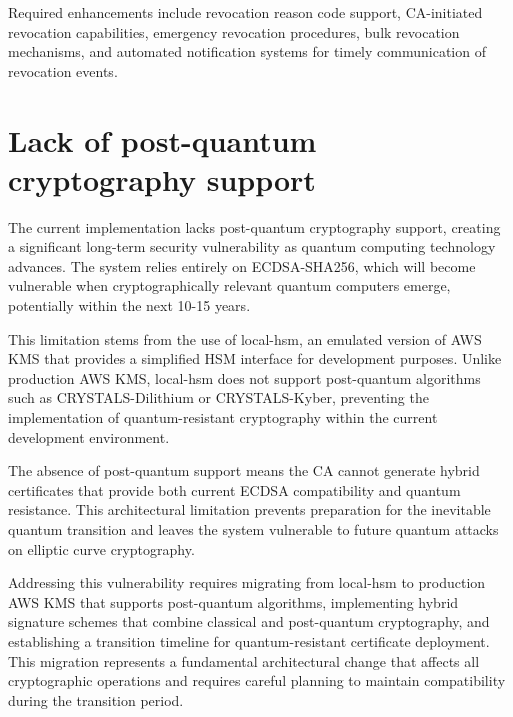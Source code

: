 Required enhancements include revocation reason code support, CA-initiated revocation capabilities, emergency revocation procedures, bulk revocation mechanisms, and automated notification systems for timely communication of revocation events.


\section{Lack of post-quantum cryptography support}

The current implementation lacks post-quantum cryptography support, creating a significant long-term security vulnerability as quantum computing technology advances. The system relies entirely on ECDSA-SHA256, which will become vulnerable when cryptographically relevant quantum computers emerge, potentially within the next 10-15 years.

This limitation stems from the use of local-hsm, an emulated version of AWS KMS that provides a simplified HSM interface for development purposes. Unlike production AWS KMS, local-hsm does not support post-quantum algorithms such as CRYSTALS-Dilithium or CRYSTALS-Kyber, preventing the implementation of quantum-resistant cryptography within the current development environment.

The absence of post-quantum support means the CA cannot generate hybrid certificates that provide both current ECDSA compatibility and quantum resistance. This architectural limitation prevents preparation for the inevitable quantum transition and leaves the system vulnerable to future quantum attacks on elliptic curve cryptography.

Addressing this vulnerability requires migrating from local-hsm to production AWS KMS that supports post-quantum algorithms, implementing hybrid signature schemes that combine classical and post-quantum cryptography, and establishing a transition timeline for quantum-resistant certificate deployment. This migration represents a fundamental architectural change that affects all cryptographic operations and requires careful planning to maintain compatibility during the transition period.